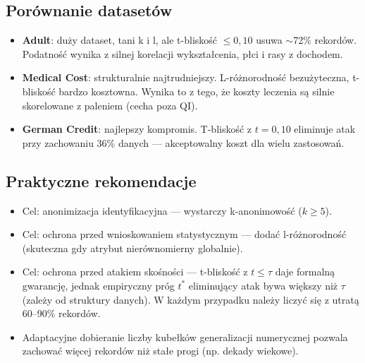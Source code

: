\documentclass[12pt,a4paper]{article}
\begin{document}
\subsection{Porównanie datasetów}

\begin{itemize}
    \item \textbf{Adult}: duży dataset, tani k i l, ale t-bliskość $\leq 0{,}10$
          usuwa $\sim$72\% rekordów. Podatność wynika z silnej korelacji
          wykształcenia, płci i rasy z dochodem.

    \item \textbf{Medical Cost}: strukturalnie najtrudniejszy. L-różnorodność
          bezużyteczna, t-bliskość bardzo kosztowna. Wynika to z tego,
          że koszty leczenia są silnie skorelowane z paleniem (cecha poza QI).

    \item \textbf{German Credit}: najlepszy kompromis. T-bliskość z $t=0{,}10$
          eliminuje atak przy zachowaniu 36\% danych --- akceptowalny koszt
          dla wielu zastosowań.
\end{itemize}

\subsection{Praktyczne rekomendacje}

\begin{itemize}
    \item Cel: anonimizacja identyfikacyjna --- wystarczy k-anonimowość ($k \geq 5$).
    \item Cel: ochrona przed wnioskowaniem statystycznym --- dodać l-różnorodność
          (skuteczna gdy atrybut nierównomierny globalnie).
    \item Cel: ochrona przed atakiem skośności --- t-bliskość z $t \leq \tau$
          daje formalną gwarancję, jednak empiryczny próg $t^*$ eliminujący atak
          bywa większy niż $\tau$ (zależy od struktury danych).
          W każdym przypadku należy liczyć się z utratą 60--90\% rekordów.
    \item Adaptacyjne dobieranie liczby kubełków generalizacji numerycznej
          pozwala zachować więcej rekordów niż stałe progi (np. dekady wiekowe).
\end{itemize}
\end{document}

